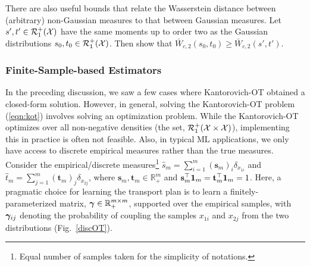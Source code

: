 There are also useful bounds that relate the Wasserstein distance between (arbitrary) non-Gaussian measures to that between Gaussian measures.
Let $s', t'\in \mathcal{R}_1^+(\mathcal{X})$ have the same moments up to order two as the Gaussian distributions $s_0, t_0\in \mathcal{R}_1^+(\mathcal{X})$. Then \cite{lbWass} show that $\bar{W}_{c, 2}(s_0, t_0)\geq \bar{W}_{c, 2}(s', t')$.

\subsubsection{Finite-Sample-based Estimators} In the preceding discussion, we saw a few cases where Kantorovich-OT obtained a closed-form solution. However, in general, solving the Kantorovich-OT problem (\ref{eqn:kot}) involves solving an optimization problem.
While the Kantorovich-OT optimizes over all non-negative densities (the set, $\mathcal{R}_1^+(\mathcal{X}\times \mathcal{X})$), implementing this in practice is often not feasible. Also, in typical ML applications, we only have access to discrete empirical measures rather than the true measures. Consider the empirical/discrete measures\footnote{Equal number of samples taken for the simplicity of notations.} $\hat{s}_m=\sum_{i=1}^m (\mathbf{s}_m)_i\delta_{x_{1i}}$ and $\hat{t}_m=\sum_{j=1}^m (\mathbf{t}_m)_j\delta_{x_{2j}}$, where $\mathbf{s}_m, \mathbf{t}_m\in \mathbb{R}_+^m$ and $\mathbf{s}_m^\top \mathbf{1}_m = \mathbf{t}_m^\top \mathbf{1}_m=1$. Here, a pragmatic choice for learning the transport plan is to learn a finitely-parameterized matrix, $\bm{\gamma} \in \mathbb{R}_+^{m\times m}$, supported over the empirical samples, with $\bm{\gamma}_{ij}$ denoting the probability of coupling the samples $x_{1i}$ and $x_{2j}$ from the two distributions (Fig.~\ref{discOT}).


